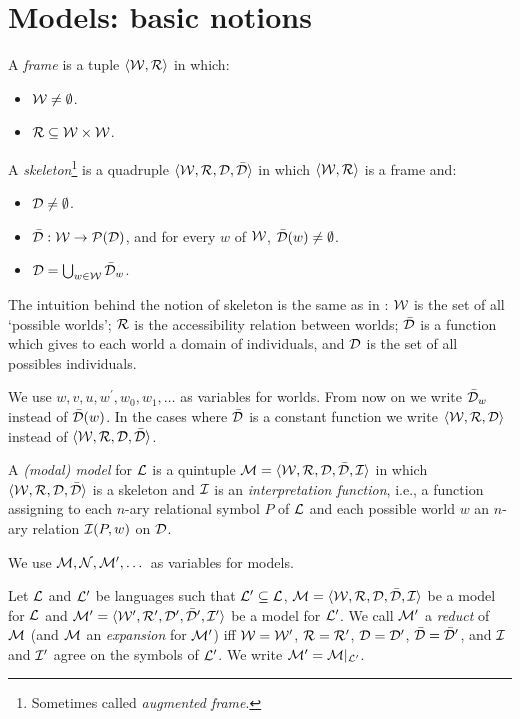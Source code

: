 \section{Models: basic notions}

\begin{defn}
A \textit{frame} is a tuple $\bl\W,\R\br$ in which:

\begin{itemize}
\item $\W \neq \vazio$.
\item $\R \subseteq \W\times \W$.
\end{itemize}
\end{defn}


\begin{defn}
A \textit{skeleton}\footnote{Sometimes called \textit{augmented frame}.} is a quadruple $\Frame$ in which $\bl\W,\R\br$ is a frame and: 
\begin{itemize} 
\item $\D \neq \vazio$.
\item $\barD: \W \impli \Pa(\D)$, and for every $w$ of $\W$, $\barD(w) \neq \vazio$. 
\item $\D = \bigcup_{w \in \W} \barD_{w}$.
\end{itemize}

\qquad The intuition behind the notion of skeleton is the same as in \cite{Kripke63}: $\W$ is the set of all `possible worlds'; $\R$ is the accessibility relation between worlds; $\barD$ is a function which gives to each world a domain of individuals, and $\D$ is the set of all possibles individuals.

\qquad We use $w, v, u, w^{\prime}, w_0, w_1, \dots$ as variables for worlds. From now on we write $\barD_{w}$ instead of $\barD(w)$. In the cases where $\barD$ is a constant function we write $\bl\W,\R, \D\br$ instead of $\Frame$.
\end{defn}

\begin{defn}
A \textit{(modal) model} for $\Li$ is a quintuple $\M = \strucA$ in which $\Frame$ is a skeleton and $\I$ is an \textit{interpretation function}, i.e., a function assigning to each $n$-ary relational symbol $P$ of $\Li$ and each possible world $w$ an $n$-ary relation $\I(P,w)$ on $\D$. 

\qquad We use $\M, \N, \M\p, \dots$ as variables for models. 
\end{defn}

\begin{defn}
Let $\Li$ and $\Li^{\prime}$ be languages such that $\Li^{\prime} \subseteq \Li$, $\M = \strucA$ be a model for $\Li$ and $\M^{\prime} = \bl\W\p,\R\p, \D\p, \barD\p,\I\p\br$ be a model for $\Li^{\prime}$. We call $\M^{\prime}$ a \textit{reduct} of $\M$ (and $\M$ an \textit{expansion} for $\M^{\prime}$) iff $\W =\W^{\prime}$, $\R =\R^{\prime}$, $\D =\D^{\prime}$, $\barD =\barD^{\prime}$, and $\I$ and $\I^{\prime}$ agree on the symbols of $\Li^{\prime}$. We write $\M^{\prime} = \M|_{\Li^{\prime}}$.
\end{defn}

